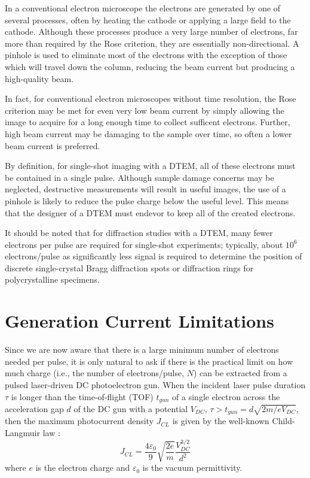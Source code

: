 In a conventional electron microscope the electrons are generated by one of several processes, often by heating the cathode or applying a large field to the cathode.
Although these processes produce a very large number of electrons, far more than required by the Rose criterion, they are essentially non-directional.
A pinhole is used to eliminate most of the electrons with the exception of those which will travel down the column, reducing the beam current but producing a high-quality beam. %

In fact, for conventional electron microscopes without time resolution, the Rose criterion may be met for even very low beam current by simply allowing the image to acquire for a long enough time to collect sufficent electrons.
Further, high beam current may be damaging to the sample over time, so often a lower beam current is preferred.

By definition, for single-shot imaging with a DTEM, all of these electrons must be contained in a single pulse.
Although sample damage concerns may be neglected, destructive measurements will result in useful images, the use of a pinhole is likely to reduce the pulse charge below the useful level.
This means that the designer of a DTEM must endevor to keep all of the created electrons.

It should be noted that for diffraction studies with a DTEM, many fewer electrons per pulse are required for single-shot experiments; typically, about $10^6$ electrons/pulse \cite{armstrong_practical_2007} as significantly less signal is required to determine the position of discrete single-crystal Bragg diffraction spots or diffraction rings for polycrystalline specimens.

\section{Generation Current Limitations}

Since we are now aware that there is a large minimum number of electrons needed per pulse, it is only natural to ask if there is the practical limit on how much charge (i.e., the number of electrons/pulse, $N$) can be extracted from a pulsed laser-driven DC photoelectron gun.
When the incident laser pulse duration $\tau$ is longer than the time-of-flight (TOF) $t_{gun}$ of a single electron across the acceleration gap $d$ of the DC gun with a potential $V_{DC}$, $\tau > t_{gun} = d \sqrt{2m/eV_{DC}}$, then the maximum photocurrent density $J_{CL}$ is given by the well-known Child-Langmuir law \cite{child_discharge_1911,langmuir_effect_1923}:
\begin{equation}
  J_{CL} = \frac{4 \varepsilon_0}{9} \sqrt{\frac{2e}{m}} \frac{V_{DC}^{3/2}}{d^2}
\end{equation}
where $e$ is the electron charge and $\varepsilon_0$ is the vacuum permittivity.

